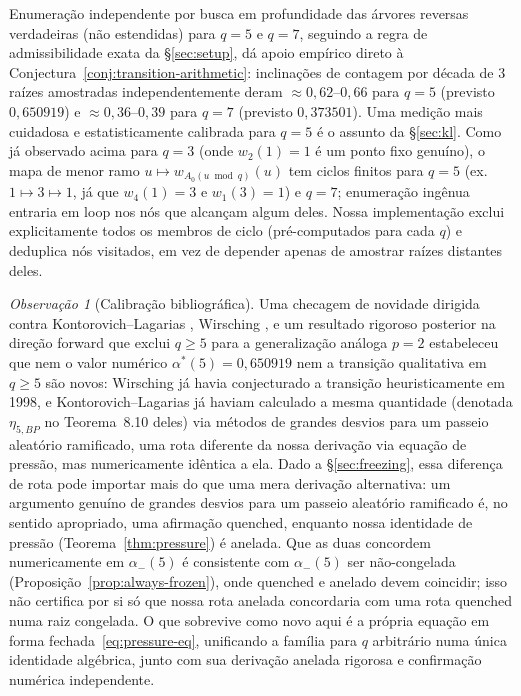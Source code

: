 \documentclass[11pt]{article}
\theoremstyle{definition}
\theoremstyle{remark}
\newtheorem{remark}[theorem]{Observação}
\begin{document}
Enumeração independente por busca em profundidade das árvores reversas
verdadeiras (não estendidas) para $q=5$ e $q=7$, seguindo a regra de
admissibilidade exata da \S\ref{sec:setup}, dá apoio empírico direto à
Conjectura~\ref{conj:transition-arithmetic}: inclinações de contagem por
década de $3$ raízes amostradas independentemente deram
$\approx 0{,}62$--$0{,}66$ para $q=5$ (previsto $0{,}650919$) e
$\approx 0{,}36$--$0{,}39$ para $q=7$ (previsto $0{,}373501$). Uma
medição mais cuidadosa e estatisticamente calibrada para $q=5$ é o
assunto da \S\ref{sec:kl}. Como já observado acima para $q=3$ (onde
$w_2(1)=1$ é um ponto fixo genuíno), o mapa de menor ramo
$u\mapsto w_{A_0(u\bmod q)}(u)$ tem ciclos finitos para $q=5$ (ex.\
$1\mapsto3\mapsto1$, já que $w_4(1)=3$ e $w_1(3)=1$) e $q=7$;
enumeração ingênua entraria em loop nos nós que alcançam algum deles.
Nossa implementação exclui explicitamente todos os membros de ciclo
(pré-computados para cada $q$) e deduplica nós visitados, em vez de
depender apenas de amostrar raízes distantes deles.

\begin{remark}[Calibração bibliográfica]\label{rem:novelty-109}
Uma checagem de novidade dirigida contra Kontorovich--Lagarias
\cite{KontorovichLagarias2009}, Wirsching \cite{Wirsching1998}, e um
resultado rigoroso posterior na direção forward que exclui $q\ge5$
para a generalização análoga $p=2$
\cite{GoncalvesGreenfeldMadrid2022} estabeleceu que nem o valor
numérico $\alpha^\ast(5)=0{,}650919$ nem a transição qualitativa em
$q\ge 5$ são novos: Wirsching já havia conjecturado a transição
heuristicamente em 1998, e Kontorovich--Lagarias já haviam calculado a
mesma quantidade (denotada $\eta_{5,BP}$ no Teorema~8.10 deles) via
métodos de grandes desvios para um passeio aleatório ramificado, uma
rota diferente da nossa derivação via equação de pressão, mas
numericamente idêntica a ela. Dado a \S\ref{sec:freezing}, essa
diferença de rota pode importar mais do que uma mera derivação
alternativa: um argumento genuíno de grandes desvios para um passeio
aleatório ramificado é, no sentido apropriado, uma afirmação quenched,
enquanto nossa identidade de pressão (Teorema~\ref{thm:pressure}) é
anelada. Que as duas concordem numericamente em $\alpha_-(5)$ é
consistente com $\alpha_-(5)$ ser não-congelada
(Proposição~\ref{prop:always-frozen}), onde quenched e anelado devem
coincidir; isso não certifica por si só que nossa rota anelada
concordaria com uma rota quenched numa raiz congelada. O que sobrevive
como novo aqui é a própria equação em forma fechada~\eqref{eq:pressure-eq},
unificando a família para $q$ arbitrário numa única identidade
algébrica, junto com sua derivação anelada rigorosa e confirmação
numérica independente.
\end{remark}
\end{document}
